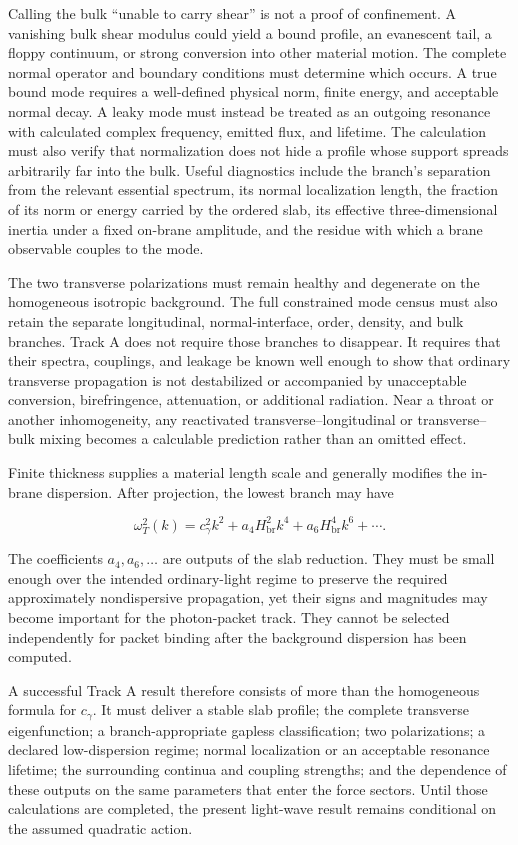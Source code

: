 Calling the bulk ``unable to carry shear'' is not a proof of confinement. A
vanishing bulk shear modulus could yield a bound profile, an evanescent tail, a
floppy continuum, or strong conversion into other material motion. The complete
normal operator and boundary conditions must determine which occurs. A true
bound mode requires a well-defined physical norm, finite energy, and acceptable
normal decay. A leaky mode must instead be treated as an outgoing resonance with
calculated complex frequency, emitted flux, and lifetime. The calculation must
also verify that normalization does not hide a profile whose support spreads
arbitrarily far into the bulk. Useful diagnostics include the branch's
separation from the relevant essential spectrum, its normal localization
length, the fraction of its norm or energy carried by the ordered slab, its
effective three-dimensional inertia under a fixed on-brane amplitude, and the
residue with which a brane observable couples to the mode.

The two transverse polarizations must remain healthy and degenerate on the
homogeneous isotropic background. The full constrained mode census must also
retain the separate longitudinal, normal-interface, order, density, and bulk
branches. Track A does not require those branches to disappear. It requires
that their spectra, couplings, and leakage be known well enough to show that
ordinary transverse propagation is not destabilized or accompanied by
unacceptable conversion, birefringence, attenuation, or additional radiation.
Near a throat or another inhomogeneity, any reactivated
transverse--longitudinal or transverse--bulk mixing becomes a calculable
prediction rather than an omitted effect.

Finite thickness supplies a material length scale and generally modifies the
in-brane dispersion. After projection, the lowest branch may have

\[
\omega_T^2(k)
=
c_\gamma^2k^2
+a_4H_{\mathrm{br}}^2k^4
+a_6H_{\mathrm{br}}^4k^6
+\cdots.
\]

The coefficients \(a_4,a_6,\ldots\) are outputs of the slab reduction. They
must be small enough over the intended ordinary-light regime to preserve the
required approximately nondispersive propagation, yet their signs and
magnitudes may become important for the photon-packet track. They cannot be
selected independently for packet binding after the background dispersion has
been computed.

A successful Track A result therefore consists of more than the homogeneous
formula for \(c_\gamma\). It must deliver a stable slab profile; the complete
transverse eigenfunction; a branch-appropriate gapless classification; two
polarizations; a declared low-dispersion regime; normal localization or an
acceptable resonance lifetime; the surrounding continua and coupling
strengths; and the dependence of these outputs on the same parameters that
enter the force sectors. Until those calculations are completed, the present
light-wave result remains conditional on the assumed quadratic action.

